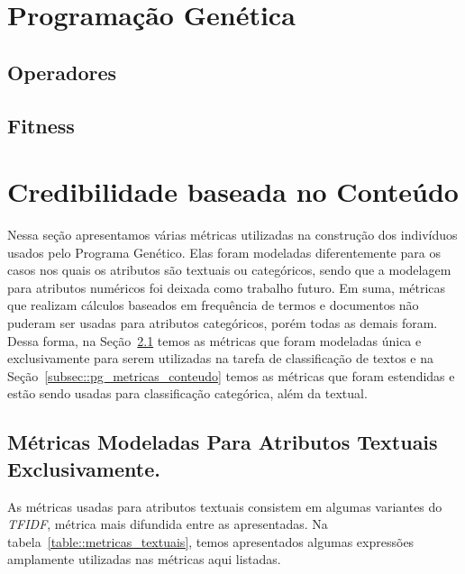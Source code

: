 
\section{Programação Genética}

\subsection{Operadores}

\subsection{Fitness}


\section{Credibilidade baseada no Conteúdo}
\label{sec::pg_cred_baseada_conteudo}

Nessa seção apresentamos várias métricas utilizadas na construção dos indivíduos usados pelo Programa Genético. Elas foram modeladas diferentemente para os casos nos quais os atributos são textuais ou categóricos, sendo que a modelagem para atributos numéricos foi deixada como trabalho futuro. Em suma, métricas que realizam cálculos baseados em frequência de termos e documentos não puderam ser usadas para atributos categóricos, porém todas as demais foram. Dessa forma, na Seção~\ref{subsec::pg_metricas_conteudo_textual} temos as métricas que foram modeladas única e exclusivamente para serem utilizadas na tarefa de classificação de textos e na Seção~\ref{subsec::pg_metricas_conteudo} temos as métricas que foram estendidas e estão sendo usadas para classificação categórica, além da textual.

\subsection{Métricas Modeladas Para Atributos Textuais Exclusivamente.}
\label{subsec::pg_metricas_conteudo_textual}

As métricas usadas para atributos textuais consistem em algumas variantes do \textit{TFIDF}, métrica mais difundida entre as apresentadas. Na tabela~\ref{table::metricas_textuais}, temos apresentados algumas expressões amplamente utilizadas nas métricas aqui listadas.


